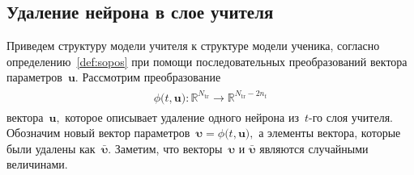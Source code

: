 \documentclass[12pt]{a&t}
\begin{document}
\subsection{Удаление нейрона в слое учителя}
Приведем структуру модели учителя к структуре модели ученика, согласно определению~\ref{def:sopos} при помощи последовательных преобразований вектора параметров~$\mathbf{u}$. Рассмотрим преобразование
\begin{gather}
\label{eq:ap:2}
\begin{aligned}
\phi\bigr(t, \mathbf{u}\bigr) : \mathbb{R}^{N_{\text{tr}}} \to \mathbb{R}^{N_{\text{tr}}-2n_t}
\end{aligned}
\end{gather}
вектора~$\mathbf{u},$ которое описывает удаление одного нейрона из~$t$-го слоя учителя.
Обозначим новый вектор параметров~$\bm{\upsilon} =  \phi\bigr(t, \mathbf{u}\bigr),$ а элементы вектора, которые были удалены как~$\bar{\bm{\upsilon}}.$ Заметим, что векторы~$\bm{\upsilon}$ и $\bar{\bm{\upsilon}}$ являются случайными величинами. 
\end{document}
